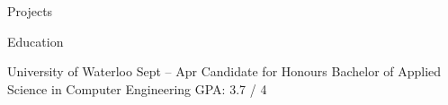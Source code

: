 \documentclass{resume} %
\begin{document}
\begin{rSection}{Projects}

\begin{rSection}{Education}
  \begin{rUniversitySection}{University of Waterloo}
                          {Sept  -- Apr }
                          {Candidate for Honours Bachelor of Applied Science in Computer Engineering}
                          {GPA: 3.7 / 4}
  \end{rUniversitySection}
\end{rSection}
    
\end{rSection}
\end{document}
